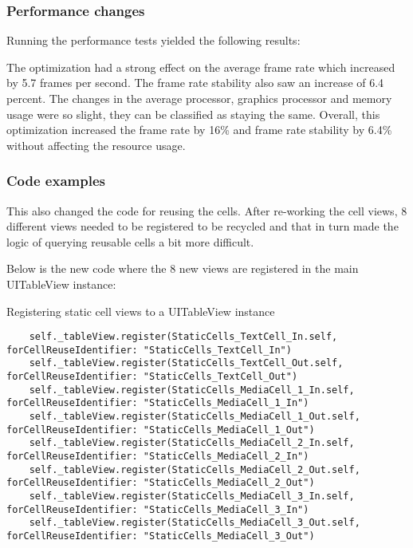 \documentclass[a4paper,12pt]{article}
\begin{document}
\subsubsection{Performance changes}
Running the performance tests yielded the following results:

The optimization had a strong effect on the average frame rate which increased by 5.7 frames per second. The frame rate stability also saw an increase of 6.4 percent. The changes in the average processor, graphics processor and memory usage were so slight, they can be classified as staying the same. Overall, this optimization increased the frame rate by 16\% and frame rate stability by 6.4\% without affecting the resource usage.

\subsubsection{Code examples}
This also changed the code for reusing the cells. After re-working the cell views, 8 different views needed to be registered to be recycled and that in turn made the logic of querying reusable cells a bit more difficult.

Below is the new code where the 8 new views are registered in the main UITableView instance:
\begin{listing}[H]
  \caption{Registering static cell views to a UITableView instance}
  \begin{verbatim}
    self._tableView.register(StaticCells_TextCell_In.self, forCellReuseIdentifier: "StaticCells_TextCell_In")
    self._tableView.register(StaticCells_TextCell_Out.self, forCellReuseIdentifier: "StaticCells_TextCell_Out")
    self._tableView.register(StaticCells_MediaCell_1_In.self, forCellReuseIdentifier: "StaticCells_MediaCell_1_In")
    self._tableView.register(StaticCells_MediaCell_1_Out.self, forCellReuseIdentifier: "StaticCells_MediaCell_1_Out")
    self._tableView.register(StaticCells_MediaCell_2_In.self, forCellReuseIdentifier: "StaticCells_MediaCell_2_In")
    self._tableView.register(StaticCells_MediaCell_2_Out.self, forCellReuseIdentifier: "StaticCells_MediaCell_2_Out")
    self._tableView.register(StaticCells_MediaCell_3_In.self, forCellReuseIdentifier: "StaticCells_MediaCell_3_In")
    self._tableView.register(StaticCells_MediaCell_3_Out.self, forCellReuseIdentifier: "StaticCells_MediaCell_3_Out")
  \end{verbatim}
\end{listing}
\end{document}
